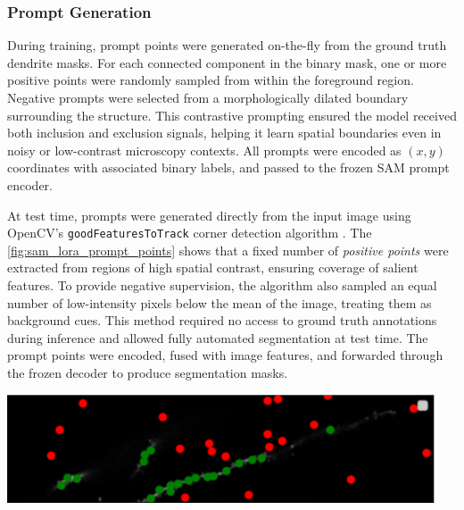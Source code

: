 \subsubsection{\textbf{Prompt Generation}}
During training, prompt points were generated on-the-fly from the ground truth dendrite masks. For each connected component in the binary mask, one or more positive points were randomly sampled from within the foreground region. Negative prompts were selected from a morphologically dilated boundary surrounding the structure. This contrastive prompting ensured the model received both inclusion and exclusion signals, helping it learn spatial boundaries even in noisy or low-contrast microscopy contexts. All prompts were encoded as $(x, y)$ coordinates with associated binary labels, and passed to the frozen \gls{SAM} prompt encoder.

At test time, prompts were generated directly from the input image using OpenCV’s \texttt{goodFeaturesToTrack} corner detection algorithm \cite{Shi_1994}. The \autoref{fig:sam_lora_prompt_points} shows that a fixed number of \textit{positive points} were extracted from regions of high spatial contrast, ensuring coverage of salient features. To provide negative supervision, the algorithm also sampled an equal number of low-intensity pixels below the mean of the image, treating them as background cues. This method required no access to ground truth annotations during inference and allowed fully automated segmentation at test time. The prompt points were encoded, fused with image features, and forwarded through the frozen decoder to produce segmentation masks. 

\begin{center}
\includegraphics[width=0.95\textwidth]{figures/57_bimap_prompt_points.png}
\label{fig:sam_lora_prompt_points}
\end{center}

